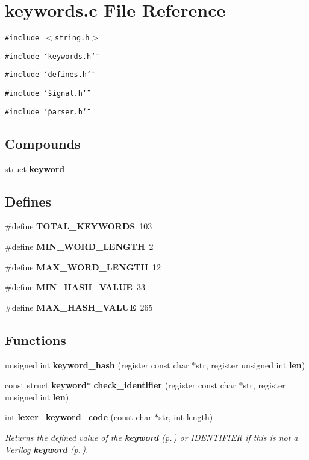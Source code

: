 \section{keywords.c File Reference}
\label{keywords_8c}
{\tt \#include $<$string.h$>$}\par
{\tt \#include \char`\"{}keywords.h\char`\"{}}\par
{\tt \#include \char`\"{}defines.h\char`\"{}}\par
{\tt \#include \char`\"{}signal.h\char`\"{}}\par
{\tt \#include \char`\"{}parser.h\char`\"{}}\par
\subsection*{Compounds}
\begin{CompactItemize}
\item 
struct {\bf keyword}
\end{CompactItemize}
\subsection*{Defines}
\begin{CompactItemize}
\item 
\#define {\bf TOTAL\_\-KEYWORDS}\ 103
\item 
\#define {\bf MIN\_\-WORD\_\-LENGTH}\ 2
\item 
\#define {\bf MAX\_\-WORD\_\-LENGTH}\ 12
\item 
\#define {\bf MIN\_\-HASH\_\-VALUE}\ 33
\item 
\#define {\bf MAX\_\-HASH\_\-VALUE}\ 265
\end{CompactItemize}
\subsection*{Functions}
\begin{CompactItemize}
\item 
unsigned int {\bf keyword\_\-hash} (register const char $\ast$str, register unsigned int {\bf len})
\item 
const struct {\bf keyword}$\ast$ {\bf check\_\-identifier} (register const char $\ast$str, register unsigned int {\bf len})
\item 
int {\bf lexer\_\-keyword\_\-code} (const char $\ast$str, int length)
\begin{CompactList}\small\item\em Returns the defined value of the {\bf keyword} {\rm (p.\,\pageref{structkeyword})} or IDENTIFIER if this is not a Verilog {\bf keyword} {\rm (p.\,\pageref{structkeyword})}.\item\end{CompactList}\end{CompactItemize}


